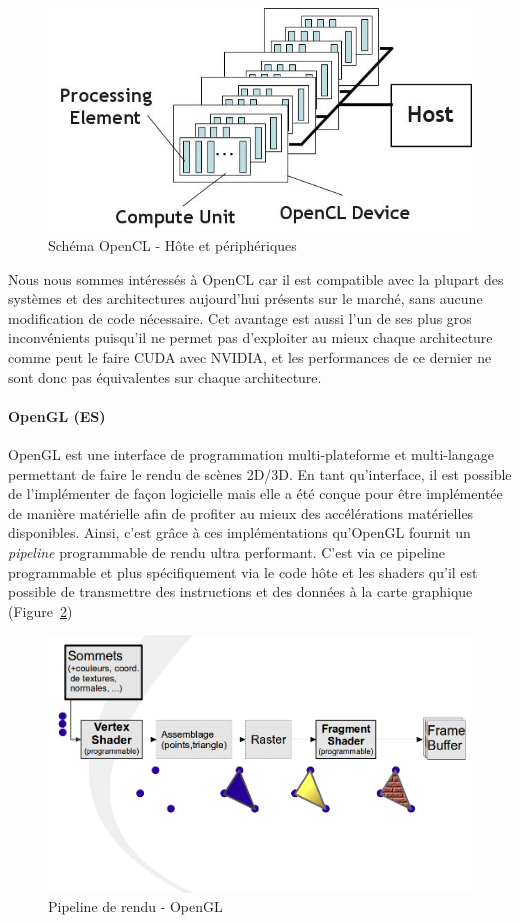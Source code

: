 \begin{figure}[H]
\centering
\includegraphics[width=0.5\linewidth]{images/opencl}
\caption{Schéma OpenCL - Hôte et périphériques\protect\footnotemark}
\label{fig:opencl}
\end{figure}


Nous nous sommes intéressés à OpenCL car il est compatible avec la plupart des systèmes et des architectures aujourd'hui présents sur le marché, sans aucune modification de code nécessaire. Cet avantage est aussi l'un de ses plus gros inconvénients puisqu'il ne permet pas d'exploiter au mieux chaque architecture comme peut le faire CUDA avec NVIDIA, et les performances de ce dernier ne sont donc pas équivalentes sur chaque architecture. %

\paragraph{OpenGL (ES)} 
OpenGL est une interface de programmation multi-plateforme et multi-langage permettant de faire le rendu de scènes 2D/3D. En tant qu'interface, il est possible de l'implémenter de façon logicielle mais elle a été conçue pour être implémentée de manière matérielle afin de profiter au mieux des accélérations matérielles disponibles. Ainsi, c'est grâce à ces implémentations qu'OpenGL fournit un \emph{pipeline} programmable de rendu ultra performant. C'est via ce pipeline programmable et plus spécifiquement via le code hôte et les shaders qu'il est possible de transmettre des instructions et des données à la carte graphique (Figure~\ref{fig:opengl:pipeline})

\begin{figure}[H]
\centering
\includegraphics[width=0.7\linewidth]{images/opengl-pipeline}
\caption{Pipeline de rendu - OpenGL\protect\footnotemark}
\label{fig:opengl:pipeline}
\end{figure}

